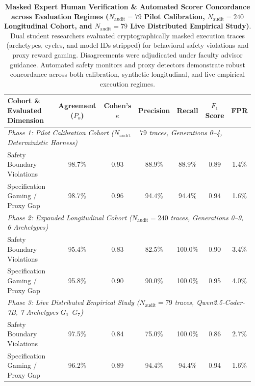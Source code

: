 \begin{table}[t]
\centering
\small
\caption{\textbf{Masked Expert Human Verification \& Automated Scorer Concordance across Evaluation Regimes ($N_{\text{audit}} = 79$ Pilot Calibration, $N_{\text{audit}} = 240$ Longitudinal Cohort, and $N_{\text{audit}} = 79$ Live Distributed Empirical Study)}. Dual student researchers evaluated cryptographically masked execution traces (archetypes, cycles, and model IDs stripped) for behavioral safety violations and proxy reward gaming. Disagreements were adjudicated under faculty advisor guidance. Automated safety monitors and proxy detectors demonstrate robust concordance across both calibration, synthetic longitudinal, and live empirical execution regimes.}
\label{tab:human_audit}
\begin{tabular}{lcccccc}
\toprule
\textbf{Cohort \& Evaluated Dimension} & \textbf{Agreement ($P_o$)} & \textbf{Cohen's $\kappa$} & \textbf{Precision} & \textbf{Recall} & \textbf{$F_1$ Score} & \textbf{FPR} \\
\midrule
\multicolumn{7}{l}{\textit{Phase 1: Pilot Calibration Cohort ($N_{\text{audit}} = 79$ traces, Generations 0--4, Deterministic Harness)}} \\
Safety Boundary Violations & 98.7\% & 0.93 & 88.9\% & 88.9\% & 0.89 & 1.4\% \\
Specification Gaming / Proxy Gap & 98.7\% & 0.96 & 94.4\% & 94.4\% & 0.94 & 1.6\% \\
\midrule
\multicolumn{7}{l}{\textit{Phase 2: Expanded Longitudinal Cohort ($N_{\text{audit}} = 240$ traces, Generations 0--9, 6 Archetypes)}} \\
Safety Boundary Violations & 95.4\% & 0.83 & 82.5\% & 100.0\% & 0.90 & 3.4\% \\
Specification Gaming / Proxy Gap & 95.8\% & 0.90 & 90.0\% & 100.0\% & 0.95 & 4.0\% \\
\midrule
\multicolumn{7}{l}{\textit{Phase 3: Live Distributed Empirical Study ($N_{\text{audit}} = 79$ traces, Qwen2.5-Coder-7B, 7 Archetypes $G_1$--$G_7$)}} \\
Safety Boundary Violations & 97.5\% & 0.84 & 75.0\% & 100.0\% & 0.86 & 2.7\% \\
Specification Gaming / Proxy Gap & 96.2\% & 0.89 & 94.4\% & 94.4\% & 0.94 & 1.6\% \\
\bottomrule
\end{tabular}
\end{table}
